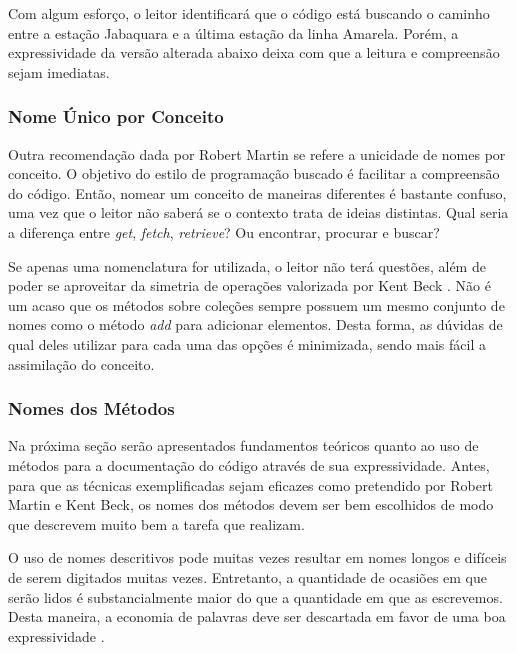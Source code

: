 

Com algum esforço, o leitor identificará que o código está buscando o caminho entre a estação Jabaquara e a última estação da linha Amarela. Porém, a expressividade da versão alterada abaixo deixa com que a leitura e compreensão sejam imediatas.




\subsubsection{Nome Único por Conceito}
Outra recomendação dada por Robert Martin \citep{Martin2008} se refere a unicidade de nomes por conceito. O objetivo do estilo de programação buscado é facilitar a compreensão do código. Então, nomear um conceito de maneiras diferentes é bastante confuso, uma vez que o leitor não saberá se o contexto trata de ideias distintas. Qual seria a diferença entre \textit{get}, \textit{fetch}, \textit{retrieve}? Ou encontrar, procurar e buscar?
	
Se apenas uma nomenclatura for utilizada, o leitor não terá questões, além de poder se aproveitar da simetria de operações valorizada por Kent Beck \citep{Beck2007}. Não é um acaso que os métodos sobre coleções sempre possuem um mesmo conjunto de nomes como o método \textit{add} para adicionar elementos. Desta forma, as dúvidas de qual deles utilizar para cada uma das opções é minimizada, sendo mais fácil a assimilação do conceito.

\subsubsection{Nomes dos Métodos}
Na próxima seção serão apresentados fundamentos teóricos quanto ao uso de métodos para a documentação do código através de sua expressividade. Antes, para que as técnicas exemplificadas sejam eficazes como pretendido por Robert Martin e Kent Beck, os nomes dos métodos devem ser bem escolhidos de modo que descrevem muito bem a tarefa que realizam.
	
O uso de nomes descritivos pode muitas vezes resultar em nomes longos e difíceis de serem digitados muitas vezes. Entretanto, a quantidade de ocasiões em que serão lidos é substancialmente maior do que a quantidade em que as escrevemos. Desta maneira, a economia de palavras deve ser descartada em favor de uma boa expressividade \citep{Beck2007}.
	
